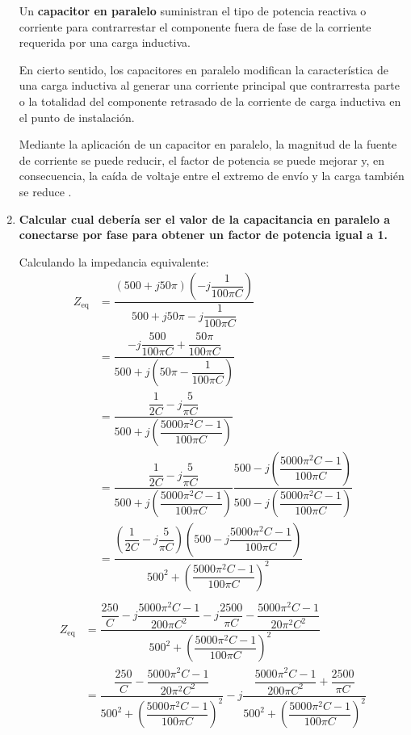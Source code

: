 \documentclass[letter,11pt]{article}
\begin{document}
\begin{enumerate}
Un \textbf{capacitor en paralelo} suministran el tipo de potencia reactiva o
corriente para contrarrestar el componente fuera de fase de la corriente
requerida por una carga inductiva.

En cierto sentido, los capacitores en paralelo modifican la característica de
una carga inductiva al generar una corriente principal que contrarresta parte o
la totalidad del componente retrasado de la corriente de carga inductiva en el
punto de instalación.

Mediante la aplicación de un capacitor en paralelo, la magnitud de la fuente de
corriente se puede reducir, el factor de potencia se puede mejorar y, en
consecuencia, la caída de voltaje entre el extremo de envío y la carga también
se reduce \cite{Merla}.

\item \textbf{Calcular cual debería ser el valor de la capacitancia en paralelo
a conectarse por fase para obtener un factor de potencia igual a 1.}

Calculando la impedancia equivalente:
\begin{equation*}
    \begin{split}
        Z_{\text{eq}}
            &= \dfrac{(500+j50\pi)\left(-j\dfrac{1}{100\pi{C}}\right)}
               {500+j50\pi-j\dfrac{1}{100\pi{C}}}\\
            &= \dfrac{-j\dfrac{500}{100\pi{C}}+\dfrac{50\pi}{100\pi{C}}}
               {500+j\left(50\pi-\dfrac{1}{100\pi{C}}\right)}\\
            &= \dfrac{\dfrac{1}{2C}-j\dfrac{5}{\pi{C}}}
               {500+j\left(\dfrac{5000\pi^2{C}-1}{100\pi{C}}\right)}\\
            &= \dfrac{\dfrac{1}{2C}-j\dfrac{5}{\pi{C}}}
               {500+j\left(\dfrac{5000\pi^2{C}-1}{100\pi{C}}\right)}
               \dfrac{500-j\left(\dfrac{5000\pi^2{C}-1}{100\pi{C}}\right)}
               {500-j\left(\dfrac{5000\pi^2{C}-1}{100\pi{C}}\right)}\\
            &= \dfrac
               {\left(\dfrac{1}{2C}-j\dfrac{5}{\pi{C}}\right)
               \left(500-j\dfrac{5000\pi^2{C}-1}{100\pi{C}}\right)}
               {500^2+\left(\dfrac{5000\pi^2{C}-1}{100\pi{C}}\right)^2}\\
    \end{split}
\end{equation*}
\begin{equation*}
    \begin{split}
        Z_{\text{eq}}
            &= \dfrac
               {\dfrac{250}{C}-j\dfrac{5000\pi^2{C}-1}{200\pi{C^2}}
               -j\dfrac{2500}{\pi{C}}-\dfrac{5000\pi^2{C}-1}{20\pi^2{C^2}}}
               {500^2+\left(\dfrac{5000\pi^2{C}-1}{100\pi{C}}\right)^2}\\
            &= \dfrac{\dfrac{250}{C}-\dfrac{5000\pi^2{C}-1}{20\pi^2{C^2}}}
               {500^2+\left(\dfrac{5000\pi^2{C}-1}{100\pi{C}}\right)^2}-
               j\dfrac{\dfrac{5000\pi^2{C}-1}{200\pi{C^2}}+\dfrac{2500}{\pi{C}}}
               {500^2+\left(\dfrac{5000\pi^2{C}-1}{100\pi{C}}\right)^2}\\
    \end{split}
\end{equation*}


\end{enumerate}
\end{document}
